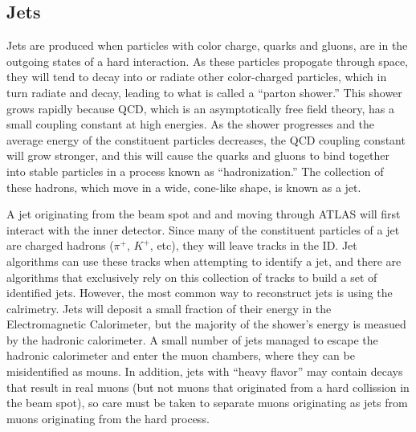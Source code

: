 \subsection{Jets}
Jets are produced when particles with color charge, quarks and gluons, are in the outgoing states of a hard interaction.
As these particles propogate through space, they will tend to decay into or radiate other color-charged particles, which in turn radiate and decay, leading to what is called a ``parton shower.''
This shower grows rapidly because QCD, which is an asymptotically free field theory, has a small coupling constant at high energies.  
As the shower progresses and the average energy of the constituent particles decreases, the QCD coupling constant will grow stronger, and this will cause the quarks and gluons to bind together into stable particles in a process known as ``hadronization.''
The collection of these hadrons, which move in a wide, cone-like shape, is known as a jet.

A jet originating from the beam spot and and moving through ATLAS will first interact with the inner detector.  Since many of the constituent particles of a jet are charged hadrons ($\pi^{+}$, $K^{+}$, etc), they will leave tracks in the ID.
Jet algorithms can use these tracks when attempting to identify a jet, and there are algorithms that exclusively rely on this collection of tracks to build a set of identified jets.
However, the most common way to reconstruct jets is using the calrimetry.
Jets will deposit a small fraction of their energy in the Electromagnetic Calorimeter, but the majority of the shower's energy is measued by the hadronic calorimeter.
A small number of jets managed to escape the hadronic calorimeter and enter the muon chambers, where they can be misidentified as mouns.
In addition, jets with ``heavy flavor'' may contain decays that result in real muons (but not muons that originated from a hard collission in the beam spot), so care must be taken to separate muons originating as jets from muons originating from the hard process.

